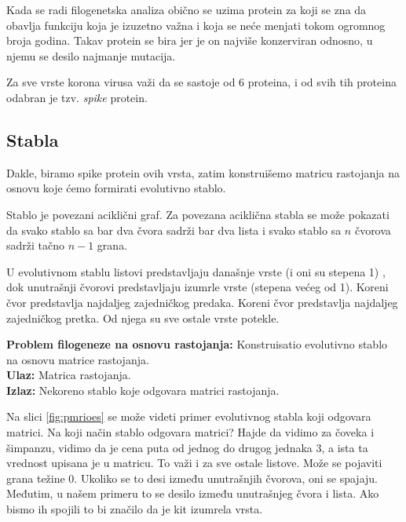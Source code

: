 Kada se radi filogenetska analiza obično se uzima protein za koji se zna da obavlja funkciju koja je izuzetno važna i koja se neće menjati tokom ogromnog broja godina. Takav protein se bira jer je on najviše konzerviran odnosno, u njemu se desilo najmanje mutacija. 

Za sve vrste korona virusa važi da se sastoje od 6 proteina, i od svih tih proteina odabran je tzv. \textit{spike} protein. 

\subsection{Stabla}
\label{subsec:stabla}

Dakle, biramo spike protein ovih vrsta, zatim konstruišemo matricu rastojanja na osnovu koje ćemo formirati evolutivno stablo.


Stablo je povezani acikli\v{c}ni graf. Za povezana acikli\v{c}na stabla se mo\v{z}e pokazati da svako stablo sa bar dva \v{c}vora sadr\v{z}i bar dva lista i svako stablo sa $n$ \v{c}vorova sadr\v{z}i ta\v{c}no $n - 1$ grana.


U evolutivnom stablu listovi predstavljaju dana\v{s}nje vrste (i oni su stepena 1)	, dok unutra\v{s}nji \v{c}vorovi predstavljaju izumrle vrste (stepena većeg od 1). Koreni \v{c}vor predstavlja najdaljeg zajedni\v{c}kog predaka. Koreni čvor predstavlja najdaljeg zajedničkog pretka. Od njega su sve ostale vrste potekle.

\begin{tcolorbox}
	\textbf{Problem filogeneze na osnovu rastojanja:} Konstruisatio evolutivno stablo na osnovu matrice rastojanja. \\
	\textbf{Ulaz:} Matrica rastojanja. \\
	\textbf{Izlaz:} Nekoreno stablo koje odgovara matrici rastojanja. 
\end{tcolorbox}

Na slici \ref{fig:pmrioes} se mo\v{z}e videti primer evolutivnog stabla koji odgovara matrici. Na koji način stablo odgovara matrici? Hajde da vidimo za čoveka i šimpanzu, vidimo da je cena puta od jednog do drugog jednaka 3, a ista ta vrednost upisana je u matricu. To važi i za sve ostale listove. Može se pojaviti grana težine 0. Ukoliko se to desi između unutrašnjih čvorova, oni se spajaju. Međutim, u našem primeru to se desilo između unutrašnjeg čvora i lista. Ako bismo ih spojili to bi značilo da je kit izumrela vrsta. 


